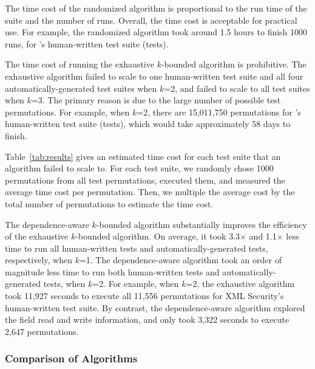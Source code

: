 The time cost of the randomized algorithm 
is proportional to the run time of the suite and the number of runs.
Overall, the time cost is acceptable for practical use.
For example, the randomized algorithm took around 1.5 hours
to finish 1000 runs,  for \jt's human-written test
suite (\jodatimetests tests).
 
The time cost of running the exhaustive $k$-bounded algorithm
is prohibitive. The exhaustive algorithm failed to
scale to one human-written test suite and all four automatically-generated
test suites when $k$=2, and failed to scale to all test suites
when $k$=3. The primary reason is due to the large
number of possible test permutations. 
For example, when $k$=2, there are 15,011,750 permutations
for \jt's human-written test suite (\jodatimetests tests),
which would take approximately 58 days to finish.

Table~\ref{tab:results} gives an estimated time cost for each
test suite that an algorithm failed to scale to. For each test suite,
we randomly chose 1000 permutations from all
test permutations, executed them, and measured the average time cost
per permutation. Then, we multiple
the average cost by the total number of permutations to estimate
the time cost.

The dependence-aware $k$-bounded algorithm substantially improves
the efficiency of the exhaustive $k$-bounded algorithm. On average,
it took 3.3$\times$ and 1.1$\times$ less time to run all
human-written tests and automatically-generated tests, respectively, when $k$=1.
The dependence-aware algorithm took an order of magnitude
less time to run both human-written tests and automatically-generated tests,
when $k$=2.
For example, when $k$=2, the exhaustive algorithm took 11,927 seconds
to execute all 11,556 permutations for XML Security's human-written test suite.
By contrast, the dependence-aware algorithm
explored the field read and write information, and
only took 3,322 seconds to execute 2,647 permutations.





\subsubsection{Comparison of Algorithms}
\label{sec:algcomparison}

